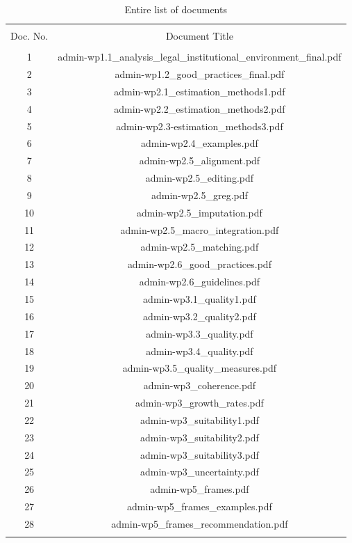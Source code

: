 \documentclass[11pt,a4paper]{article}
\begin{document}
\begin{table}[!htbp] \centering 
	\caption{Entire list of documents} 
	\label{document_list} 
	\begin{tabular}{@{\extracolsep{5pt}} cc} 
		\\[-1.8ex]\hline 
		\hline \\[-1.8ex] 
		Doc. No. & Document Title \\ 
		\hline \\[-1.8ex] 
		1 & admin-wp1.1\_analysis\_legal\_institutional\_environment\_final.pdf \\ 
		2 & admin-wp1.2\_good\_practices\_final.pdf \\ 
		3 & admin-wp2.1\_estimation\_methods1.pdf \\ 
		4 & admin-wp2.2\_estimation\_methods2.pdf \\ 
		5 & admin-wp2.3-estimation\_methods3.pdf \\ 
		6 & admin-wp2.4\_examples.pdf \\ 
		7 & admin-wp2.5\_alignment.pdf \\ 
		8 & admin-wp2.5\_editing.pdf \\ 
		9 & admin-wp2.5\_greg.pdf \\ 
		10 & admin-wp2.5\_imputation.pdf \\ 
		11 & admin-wp2.5\_macro\_integration.pdf \\ 
		12 & admin-wp2.5\_matching.pdf \\ 
		13 & admin-wp2.6\_good\_practices.pdf \\ 
		14 & admin-wp2.6\_guidelines.pdf \\ 
		15 & admin-wp3.1\_quality1.pdf \\ 
		16 & admin-wp3.2\_quality2.pdf \\ 
		17 & admin-wp3.3\_quality.pdf \\ 
		18 & admin-wp3.4\_quality.pdf \\ 
		19 & admin-wp3.5\_quality\_measures.pdf \\ 
		20 & admin-wp3\_coherence.pdf \\ 
		21 & admin-wp3\_growth\_rates.pdf \\ 
		22 & admin-wp3\_suitability1.pdf \\ 
		23 & admin-wp3\_suitability2.pdf \\ 
		24 & admin-wp3\_suitability3.pdf \\ 
		25 & admin-wp3\_uncertainty.pdf \\ 
		26 & admin-wp5\_frames.pdf \\ 
		27 & admin-wp5\_frames\_examples.pdf \\ 
		28 & admin-wp5\_frames\_recommendation.pdf \\ 
		\hline \\[-1.8ex] 
	\end{tabular} 
\end{table} 
\end{document}
